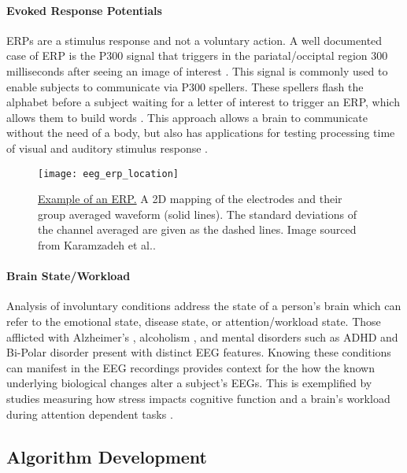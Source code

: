 \paragraph*{Evoked Response Potentials}
\acp{ERP} are a stimulus response and not a voluntary action. A well documented case of \ac{ERP} is the P300 signal that triggers in the pariatal/occiptal region 300 milliseconds after seeing an image of interest \cite{Picton1992}. This signal is commonly used to enable subjects to communicate via P300 spellers. These spellers flash the alphabet before a subject waiting for a letter of interest to trigger an \ac{ERP}, which allows them to build words \cite{Farwell1988}. This approach allows a brain to communicate without the need of a body, but also has applications for testing processing time of visual and auditory stimulus response \cite{Karamzadeh2013}.

\begin{figure}[h]
\centering
\texttt{[image: eeg\_erp\_location]}
\caption[Example of an ERP]{\underline{Example of an ERP.} A 2D mapping of the electrodes and their group averaged waveform (solid lines). The standard deviations of the channel averaged are given as the dashed lines. Image sourced from Karamzadeh et al.\cite{Karamzadeh2013}.}
\label{fig:erpExample}
\end{figure}

\paragraph*{Brain State/Workload}
Analysis of involuntary conditions address the state of a person's brain which can refer to the emotional state, disease state, or attention/workload state. Those afflicted with Alzheimer's \cite{Jeong2004}, alcoholism \cite{Porjesz2005}, and mental disorders such as \ac{ADHD} and Bi-Polar disorder \cite{Basar2008} present with distinct \ac{EEG} features. Knowing these conditions can manifest in the \ac{EEG} recordings provides context for the how the known underlying biological changes alter a subject's \acp{EEG}. This is exemplified by studies measuring how stress impacts cognitive function \cite{Lupien2007} and a brain's workload during attention dependent tasks \cite{Schultze-Kraft2016}.

\subsection{Algorithm Development}

